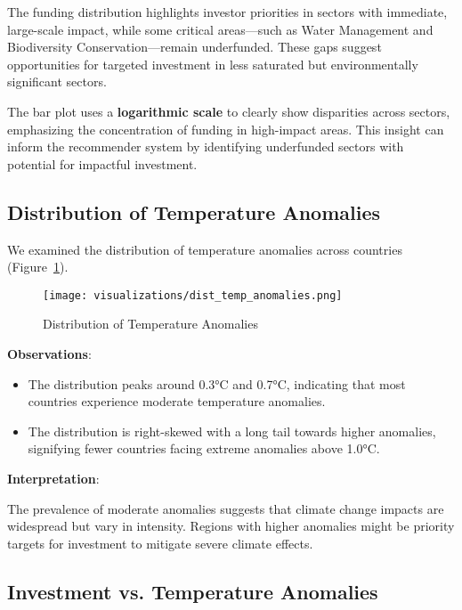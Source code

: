 \documentclass[sigconf]{acmart}
\begin{document}
The funding distribution highlights investor priorities in sectors with immediate, large-scale impact, while some critical areas—such as Water Management and Biodiversity Conservation—remain underfunded. These gaps suggest opportunities for targeted investment in less saturated but environmentally significant sectors.

The bar plot uses a \textbf{logarithmic scale} to clearly show disparities across sectors, emphasizing the concentration of funding in high-impact areas. This insight can inform the recommender system by identifying underfunded sectors with potential for impactful investment.

\subsection{Distribution of Temperature Anomalies}

We examined the distribution of temperature anomalies across countries (Figure~\ref{fig:temp_anomalies}).

\begin{figure}[htpb]
    \centering
    \texttt{[image: visualizations/dist\_temp\_anomalies.png]}
    \caption{Distribution of Temperature Anomalies}
    \label{fig:temp_anomalies}
\end{figure}

\textbf{Observations}:

\begin{itemize}
    \item The distribution peaks around 0.3°C and 0.7°C, indicating that most countries experience moderate temperature anomalies.
    \item The distribution is right-skewed with a long tail towards higher anomalies, signifying fewer countries facing extreme anomalies above 1.0°C.
\end{itemize}

\textbf{Interpretation}:

The prevalence of moderate anomalies suggests that climate change impacts are widespread but vary in intensity. Regions with higher anomalies might be priority targets for investment to mitigate severe climate effects.

\subsection{Investment vs. Temperature Anomalies}
\end{document}
